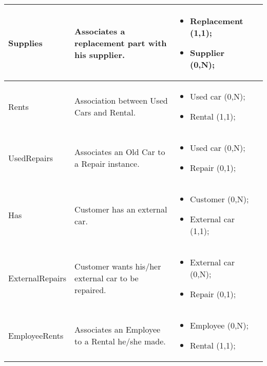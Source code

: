\begin{longtable}{|p{}|p{} |p{}|p{} |}
Supplies & Associates a replacement part with his supplier. & \begin{itemize}
	\vspace{-1em}
	\item Replacement (1,1);
	\item Supplier (0,N);
\end{itemize}
& \\\hline

Rents & Association between Used Cars and Rental. & \begin{itemize}
	\vspace{-1em}
	\item Used car (0,N);
	\item Rental (1,1);
\end{itemize}
& \\\hline

UsedRepairs & Associates an Old Car to a Repair instance. & \begin{itemize}
	\vspace{-1em}
	\item Used car (0,N);
	\item Repair (0,1);
\end{itemize}
& \\\hline

Has & Customer has an external car. & \begin{itemize}
	\vspace{-1em}
	\item Customer (0,N);
	\item External car (1,1);
\end{itemize}
& \\\hline

ExternalRepairs & Customer wants his/her external car to be repaired. & \begin{itemize}
	\vspace{-1em}
	\item External car (0,N);
	\item Repair (0,1);
\end{itemize}
& \\\hline

EmployeeRents & Associates an Employee to a Rental he/she made. & \begin{itemize}
	\vspace{-1em}
	\item Employee (0,N);
	\item Rental (1,1);
\end{itemize}
& \\\hline


\end{longtable}
